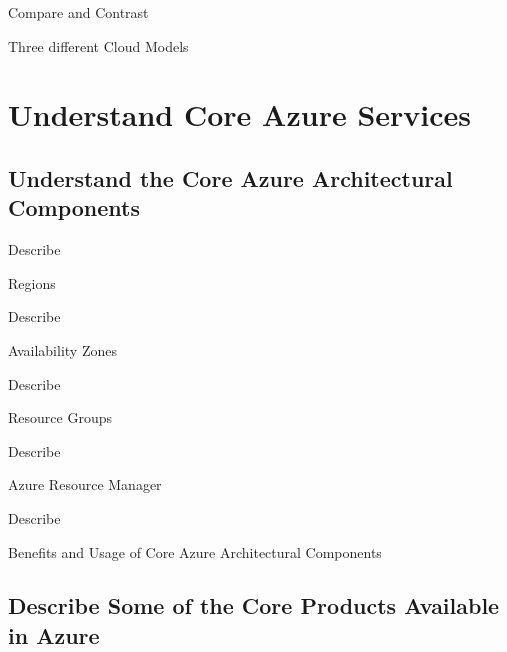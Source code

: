 \documentclass{scrartcl}
\newenvironment{flashcard}[2][]{%
    #1
    \vfill
    \centerline{\Large{#2}}
    \vfill
    \newpage
}
{\newpage}
\newcommand{\sectioncard}[1]{
    \vspace*{\stretch{1}}
    \section{#1}
    \vspace*{\stretch{1}}
    \pagebreak
}
\newcommand{\subsectioncard}[1]{
    \vspace*{\stretch{1}}
    \subsection{#1}
    \vspace*{\stretch{1}}
    \pagebreak
}
\begin{document}
    \begin{flashcard}[Compare and Contrast]{Three different Cloud Models}

    \end{flashcard}

    \sectioncard{Understand Core Azure Services}

    \subsectioncard{Understand the Core Azure Architectural Components}

    \begin{flashcard}[Describe]{Regions}

    \end{flashcard}

    \begin{flashcard}[Describe]{Availability Zones}

    \end{flashcard}

    \begin{flashcard}[Describe]{Resource Groups}

    \end{flashcard}

    \begin{flashcard}[Describe]{Azure Resource Manager}

    \end{flashcard}

    \begin{flashcard}[Describe]{Benefits and Usage of Core Azure Architectural Components}

    \end{flashcard}

    \subsectioncard{Describe Some of the Core Products Available in Azure}
\end{document}
